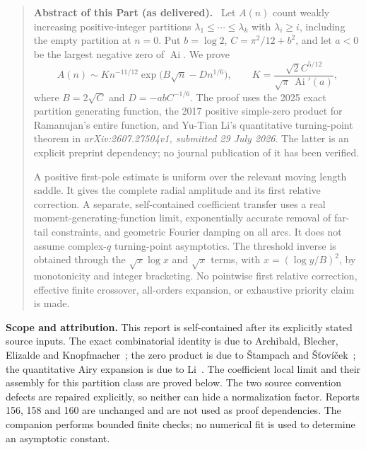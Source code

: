 \documentclass[11pt,letterpaper]{article}
\numberwithin{equation}{section}
\theoremstyle{remark}\newtheorem{remark}[theorem]{Remark}
\newcommand{\Ai}{\operatorname{Ai}}
\newenvironment{partabstract}{\begin{quote}\small\noindent\textbf{Abstract of this Part (as delivered).}\ }{\end{quote}}
\begin{document}
\begin{partabstract}
Let $A(n)$ count weakly increasing positive-integer partitions
$\lambda_1\leq\cdots\leq\lambda_k$ with $\lambda_i\geq i$, including the empty
partition at $n=0$. Put $b=\log2$, $C=\pi^2/12+b^2$, and let $a<0$ be
the largest negative zero of $\Ai$. We prove
\[
 A(n)\sim K n^{-11/12}\exp\bigl(B\sqrt n-Dn^{1/6}\bigr),\qquad
 K=\frac{\sqrt2 C^{5/12}}{\sqrt\pi\,\Ai'(a)},
\]
where $B=2\sqrt C$ and $D=-abC^{-1/6}$.
The proof uses the 2025 exact partition generating function, the
2017 positive simple-zero product for Ramanujan's entire function,
and Yu-Tian Li's quantitative turning-point theorem in
\emph{arXiv:2607.27504v1, submitted 29 July 2026}.
The latter is an explicit preprint dependency; no journal publication
of it has been verified.

A positive first-pole estimate is uniform over the relevant moving
length saddle. It gives the complete radial amplitude and its first
relative correction. A separate, self-contained coefficient transfer
uses a real moment-generating-function limit, exponentially accurate
removal of far-tail constraints, and geometric Fourier damping on all
arcs. It does not assume complex-$q$ turning-point asymptotics.
The threshold inverse is obtained through the $\sqrt{x}\log x$ and
$\sqrt{x}$ terms, with $x=(\log y/B)^2$, by monotonicity and integer
bracketing. No pointwise first relative correction, effective finite
crossover, all-orders expansion, or exhaustive priority claim is made.
\end{partabstract}
\noindent\textbf{Scope and attribution.}
This report is self-contained after its explicitly stated source
inputs. The exact combinatorial identity is due to Archibald, Blecher,
Elizalde and Knopfmacher~\cite{abek}; the zero product is due to
\v{S}tampach and \v{S}\v{t}ov\'i\v{c}ek~\cite{ss}; the quantitative
Airy expansion is due to Li~\cite{li}. The coefficient local limit and
their assembly for this partition class are proved below. The two
source convention defects are repaired explicitly, so neither can
hide a normalization factor. Reports 156, 158 and 160 are unchanged
and are not used as proof dependencies. The companion performs bounded
finite checks; no numerical fit is used to determine an asymptotic
constant.
\medskip
\end{document}
